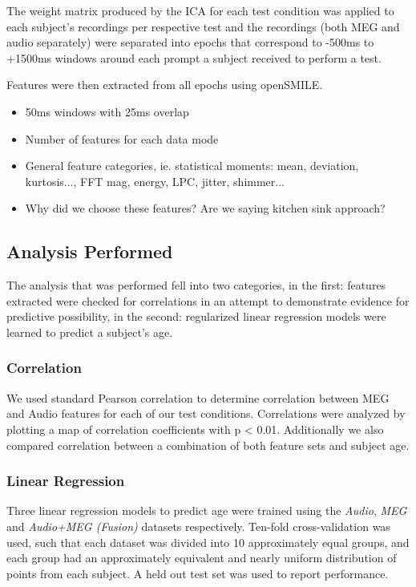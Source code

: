 \documentclass[a4paper]{article}
\begin{document}
The weight matrix produced by the ICA for each test condition was applied to each subject's recordings per respective test and the recordings (both MEG and audio separately) were separated into epochs that correspond to -500ms to +1500ms windows around each prompt a subject received to perform a test.

Features were then extracted from all epochs using openSMILE.

\begin{itemize}
\item 50ms windows with 25ms overlap
\item Number of features for each data mode
\item General feature categories, ie. statistical moments: mean, deviation, kurtosis..., FFT mag, energy,
  LPC, jitter, shimmer...
\item Why did we choose these features? Are we saying kitchen sink approach?
\end{itemize}

\subsection{Analysis Performed}

The analysis that was performed fell into two categories, in the first: features extracted were checked for correlations in an attempt to demonstrate evidence for predictive possibility, in the second: regularized linear regression models were learned to predict a subject's age.

\subsubsection{Correlation}

We used standard Pearson correlation to determine correlation between MEG and Audio features for each of our test conditions. Correlations were analyzed by plotting a map of correlation coefficients with p < 0.01. Additionally we also compared correlation between a combination of both feature sets and subject age.

\subsubsection{Linear Regression}

Three linear regression models to predict age were trained using the \textit{Audio}, \textit{MEG} and \textit{Audio+MEG (Fusion)} datasets respectively. Ten-fold cross-validation was used, such that each dataset was divided into 10 approximately equal groups, and each group had an approximately equivalent and nearly uniform distribution of points from each subject. A held out test set was used to report performance.
\end{document}

